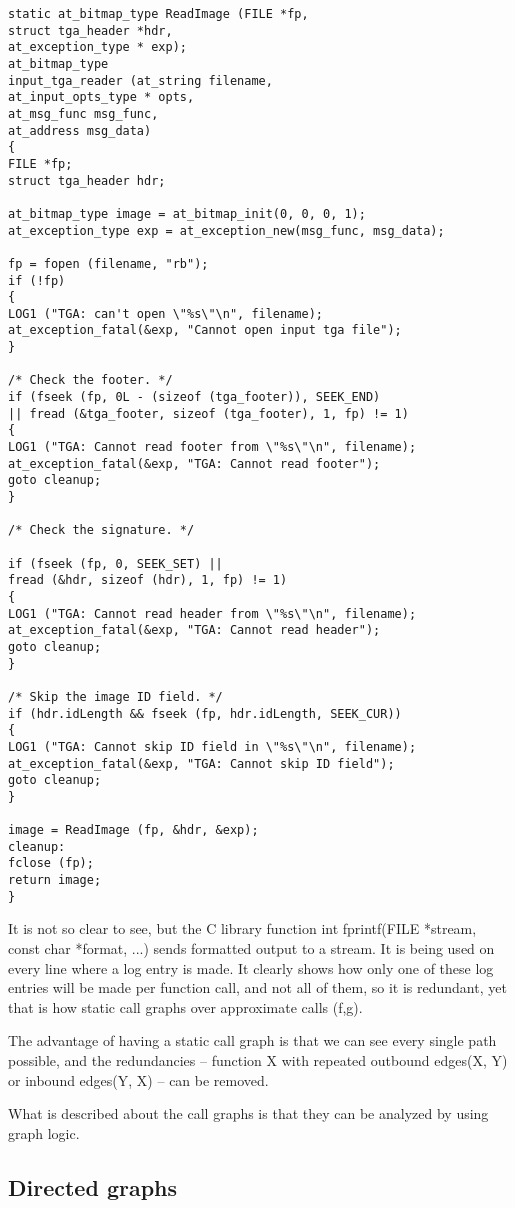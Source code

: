 \begin{lstlisting}
static at_bitmap_type ReadImage (FILE *fp,
struct tga_header *hdr,
at_exception_type * exp);
at_bitmap_type
input_tga_reader (at_string filename,
at_input_opts_type * opts,
at_msg_func msg_func, 
at_address msg_data)
{
FILE *fp;
struct tga_header hdr;

at_bitmap_type image = at_bitmap_init(0, 0, 0, 1);
at_exception_type exp = at_exception_new(msg_func, msg_data);

fp = fopen (filename, "rb");
if (!fp)
{
LOG1 ("TGA: can't open \"%s\"\n", filename);
at_exception_fatal(&exp, "Cannot open input tga file");
}

/* Check the footer. */
if (fseek (fp, 0L - (sizeof (tga_footer)), SEEK_END)
|| fread (&tga_footer, sizeof (tga_footer), 1, fp) != 1)
{
LOG1 ("TGA: Cannot read footer from \"%s\"\n", filename);
at_exception_fatal(&exp, "TGA: Cannot read footer");
goto cleanup;
}

/* Check the signature. */

if (fseek (fp, 0, SEEK_SET) ||
fread (&hdr, sizeof (hdr), 1, fp) != 1)
{
LOG1 ("TGA: Cannot read header from \"%s\"\n", filename);
at_exception_fatal(&exp, "TGA: Cannot read header");
goto cleanup;
}

/* Skip the image ID field. */
if (hdr.idLength && fseek (fp, hdr.idLength, SEEK_CUR))
{
LOG1 ("TGA: Cannot skip ID field in \"%s\"\n", filename);
at_exception_fatal(&exp, "TGA: Cannot skip ID field");
goto cleanup;
}

image = ReadImage (fp, &hdr, &exp);
cleanup:  
fclose (fp);
return image;
}
\end{lstlisting}

It is not so clear to see, but the C library function int fprintf(FILE *stream, const char *format, ...) sends formatted output to a stream. It is being used on every line where a log entry is made. It clearly shows how only one of these log entries will be made per function call, and not all of them, so it is redundant, yet that is how static call graphs over approximate calls (f,g).

The advantage of having a static call graph is that we can see every single path possible, and the redundancies -- function X with repeated outbound edges(X, Y) or inbound edges(Y, X) -- can be removed.

What is described about the call graphs is that they can be analyzed by using graph logic.

\subsection{Directed graphs}

